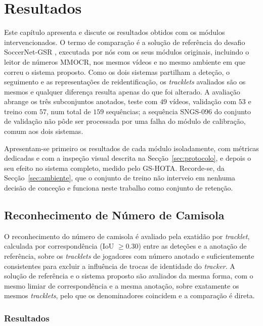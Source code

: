 \chapter{Resultados}\label{cap:resultados}

Este capítulo apresenta e discute os resultados obtidos com os módulos intervencionados. O termo de comparação é a solução de referência do desafio SoccerNet-GSR \citep{somers2024soccernet}, executada por nós com os seus módulos originais, incluindo o leitor de números MMOCR, nos mesmos vídeos e no mesmo ambiente em que correu o sistema proposto. Como os dois sistemas partilham a deteção, o seguimento e as representações de reidentificação, os \emph{tracklets} avaliados são os mesmos e qualquer diferença resulta apenas do que foi alterado. A avaliação abrange os três subconjuntos anotados, teste com $49$ vídeos, validação com $53$ e treino com $57$, num total de $159$ sequências; a sequência SNGS-096 do conjunto de validação não pôde ser processada por uma falha do módulo de calibração, comum aos dois sistemas.

Apresentam-se primeiro os resultados de cada módulo isoladamente, com métricas dedicadas e com a inspeção visual descrita na Secção~\ref{sec:protocolo}, e depois o seu efeito no sistema completo, medido pelo GS-HOTA. Recorde-se, da Secção~\ref{sec:ambiente}, que o conjunto de treino não interveio em nenhuma decisão de conceção e funciona neste trabalho como conjunto de retenção.

\section{Reconhecimento de Número de Camisola}\label{sec:res_jnr}

O reconhecimento do número de camisola é avaliado pela exatidão por \emph{tracklet}, calculada por correspondência (IoU $\geq 0.30$) entre as deteções e a anotação de referência, sobre os \emph{tracklets} de jogadores com número anotado e suficientemente consistentes para excluir a influência de trocas de identidade do \emph{tracker}. A solução de referência e o sistema proposto são avaliados da mesma forma, com o mesmo limiar de correspondência e a mesma anotação, sobre exatamente os mesmos \emph{tracklets}, pelo que os denominadores coincidem e a comparação é direta.

\subsection{Resultados}\label{sec:res_jnr_resultados}

